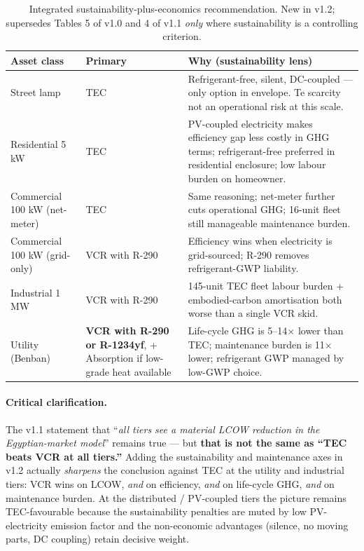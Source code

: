 \documentclass[11pt,a4paper]{article}
\begin{document}
\begin{table}[h]
\centering\small
\caption{Integrated sustainability-plus-economics recommendation. New in v1.2; supersedes Tables 5 of v1.0 and 4 of v1.1 \emph{only} where sustainability is a controlling criterion.}
\label{tab:integrated_reco}
\begin{tabular}{@{}llp{8.5cm}@{}}
\toprule
\textbf{Asset class} & \textbf{Primary} & \textbf{Why (sustainability lens)}\\
\midrule
Street lamp       & TEC  & Refrigerant-free, silent, DC-coupled --- only option in envelope. Te scarcity not an operational risk at this scale.\\
Residential 5 kW  & TEC  & PV-coupled electricity makes efficiency gap less costly in GHG terms; refrigerant-free preferred in residential enclosure; low labour burden on homeowner.\\
Commercial 100 kW (net-meter) & TEC & Same reasoning; net-meter further cuts operational GHG; 16-unit fleet still manageable maintenance burden.\\
Commercial 100 kW (grid-only) & VCR with R-290 & Efficiency wins when electricity is grid-sourced; R-290 removes refrigerant-GWP liability.\\
Industrial 1 MW   & VCR with R-290 & 145-unit TEC fleet labour burden + embodied-carbon amortisation both worse than a single VCR skid.\\
Utility (Benban)  & \textbf{VCR with R-290 or R-1234yf}, + Absorption if low-grade heat available & Life-cycle GHG is 5--14$\times$ lower than TEC; maintenance burden is 11$\times$ lower; refrigerant GWP managed by low-GWP choice.\\
\bottomrule
\end{tabular}
\end{table}

\paragraph{Critical clarification.} The v1.1 statement that ``\emph{all tiers see a material LCOW reduction in the Egyptian-market model}'' remains true --- but \textbf{that is not the same as ``TEC beats VCR at all tiers.''} Adding the sustainability and maintenance axes in v1.2 actually \emph{sharpens} the conclusion against TEC at the utility and industrial tiers: VCR wins on LCOW, \emph{and} on efficiency, \emph{and} on life-cycle GHG, \emph{and} on maintenance burden. At the distributed / PV-coupled tiers the picture remains TEC-favourable because the sustainability penalties are muted by low PV-electricity emission factor and the non-economic advantages (silence, no moving parts, DC coupling) retain decisive weight.
\end{document}
